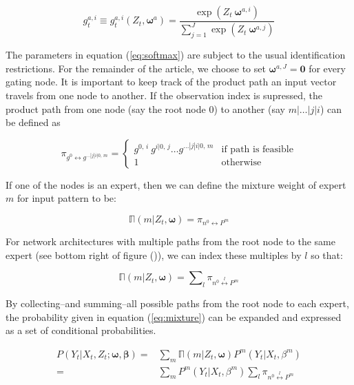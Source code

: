 \documentclass[12pt]{article}
\newcommand{\gateprod}[2]{\pi_{#1 \longleftrightarrow #2}}
\newcommand{\sumgateprod}[3]{\pi_{#1 \overset{#3}{\longleftrightarrow} #2}}
\newcommand{\shortsum}[1]{\sum \nolimits_{#1}}
\newcommand{\expmixwt}[0]{\mathbb{\Pi}}
\begin{document}
\begin{equation} \label{eq:softmax}
  g^{a,i}_{t} \equiv g^{a,i}_{t}(Z_{t}, \boldsymbol{\omega}^{a}) = \frac{\exp(Z_{t} \ \boldsymbol{\omega}^{a,i})}{\sum^{J}_{j=1} {\exp(Z_{t} \ \boldsymbol{\omega}^{a,j})}}
\end{equation}

The parameters in equation (\ref{eq:softmax}) are subject to the usual
identification restrictions. For the remainder of the article, we choose
to set $\boldsymbol{\omega}^{a,J} = \boldsymbol{0}$ for every gating node.
It is important to keep track of the product path an input vector travels from
one node to another. If the observation index is supressed, the product path
from one node (say the root node $0$) to another (say $m|\ldots|j|i$)
can be defined as

\begin{equation} \label{eq:gpath}
  \gateprod{g^{0}}{g^{\ldots|j|i|0, \, m}} =
    \begin{cases} 
       g^{0, \, i} \ g^{i|0, \, j} \ldots g^{\dots|j|i|0, \, m} & \textrm{if path is feasible} \\
       1 & \textrm{otherwise}
    \end{cases}
\end{equation}

If one of the nodes is an expert, then we can define the mixture weight
of expert $m$ for input pattern to be:

\begin{equation} \label{eq:pathsum}
  \expmixwt(m | Z_{t}, \boldsymbol{\omega}) = \gateprod{n^{0}}{P^{m}}
\end{equation}

For network architectures with multiple paths from the root node to the same expert
(see bottom right of figure ()), we can index these multiples by $l$ so that:

\begin{equation} \label{eq:pathsums}
  \expmixwt(m | Z_{t}, \boldsymbol{\omega}) = \shortsum{l} \sumgateprod{n^{0}}{P^{m}}{l} 
\end{equation}



By collecting--and summing--all possible paths from the root node to each
expert, the probability given in equation (\ref{eq:mixture}) can be expanded
and expressed as a set of conditional probabilities.

\begin{equation} \label{eq:contribution}
  \begin{split}
    P(Y_{t}|X_{t}, Z_{t}; \boldsymbol{\omega}, \boldsymbol{\beta}) =& \sum_{m} \expmixwt(m | Z_{t}, \boldsymbol{\omega}) P^{m}(Y_{t}|X_{t},\beta^{m}) \\ 
      =& \sum_{m} P^{m}(Y_{t}|X_{t}, \beta^{m}) \shortsum{l} \sumgateprod{n^{0}}{P^{m}}{l}
  \end{split}
\end{equation}
\end{document}
